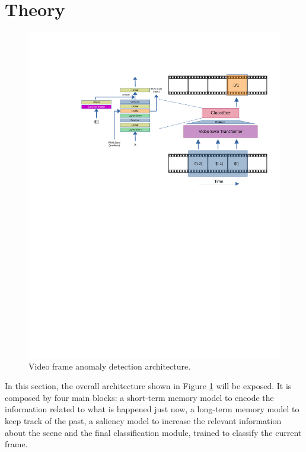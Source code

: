 \section{Theory}
\fboxsep=1mm%
\fboxrule=1pt%

\begin{figure}[t]
    \centering
        \includegraphics[trim=120 420 0 100, clip, width=1.\linewidth]{images/arch.pdf}
    \caption{Video frame anomaly detection architecture.}
    \label{fig:arch}
\end{figure}

In this section, the overall architecture shown in Figure \ref{fig:arch} will be exposed.
It is composed by four main blocks: a short-term memory model to encode the information related to what is happened just now, a long-term memory model to keep track of the past, a saliency model to increase the relevant information about the scene and the final classification module, trained to classify the current frame.

